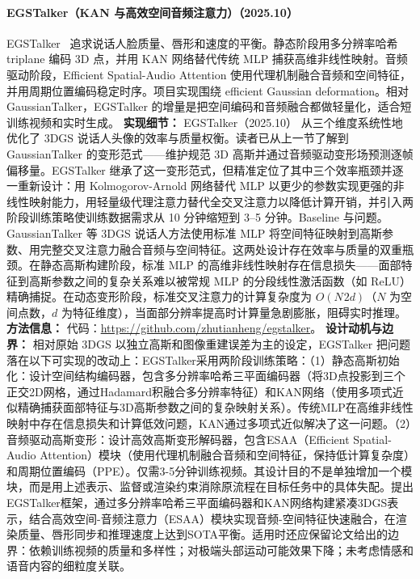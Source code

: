 \paragraph{EGSTalker（KAN 与高效空间音频注意力）（2025.10）}
EGSTalker~\cite{2510_08587} 追求说话人脸质量、唇形和速度的平衡。静态阶段用多分辨率哈希 triplane 编码 3D 点，并用 KAN 网络替代传统 MLP 捕获高维非线性映射。音频驱动阶段，Efficient Spatial-Audio Attention 使用代理机制融合音频和空间特征，并用周期位置编码稳定时序。项目实现围绕 efficient Gaussian deformation。相对 GaussianTalker，EGSTalker 的增量是把空间编码和音频融合都做轻量化，适合短训练视频和实时生成。
\textbf{实现细节：} EGSTalker（2025.10） 从三个维度系统性地优化了 3DGS 说话人头像的效率与质量权衡。读者已从上一节了解到 GaussianTalker 的变形范式——维护规范 3D 高斯并通过音频驱动变形场预测逐帧偏移量。EGSTalker 继承了这一变形范式，但精准定位了其中三个效率瓶颈并逐一重新设计：用 Kolmogorov-Arnold 网络替代 MLP 以更少的参数实现更强的非线性映射能力，用轻量级代理注意力替代全交叉注意力以降低计算开销，并引入两阶段训练策略使训练数据需求从 10 分钟缩短到 3--5 分钟。Baseline 与问题。GaussianTalker 等 3DGS 说话人方法使用标准 MLP 将空间特征映射到高斯参数、用完整交叉注意力融合音频与空间特征。这两处设计存在效率与质量的双重瓶颈。在静态高斯构建阶段，标准 MLP 的高维非线性映射存在信息损失——面部特征到高斯参数之间的复杂关系难以被常规 MLP 的分段线性激活函数（如 ReLU）精确捕捉。在动态变形阶段，标准交叉注意力的计算复杂度为 $O(N^{}2 d)$（$N$ 为空间点数，$d$ 为特征维度），当面部分辨率提高时计算量急剧膨胀，阻碍实时推理。
\textbf{方法信息：} 代码：\url{https://github.com/zhutianheng/egstalker}。
\textbf{设计动机与边界：} 相对原始 3DGS 以独立高斯和图像重建误差为主的设定，EGSTalker 把问题落在以下可实现的改动上：EGSTalker采用两阶段训练策略：（1）静态高斯初始化：设计空间结构编码器，包含多分辨率哈希三平面编码器（将3D点投影到三个正交2D网格，通过Hadamard积融合多分辨率特征）和KAN网络（使用多项式近似精确捕获面部特征与3D高斯参数之间的复杂映射关系）。传统MLP在高维非线性映射中存在信息损失和计算低效问题，KAN通过多项式近似解决了这一问题。（2）音频驱动高斯变形：设计高效高斯变形解码器，包含ESAA（Efficient Spatial-Audio Attention）模块（使用代理机制融合音频和空间特征，保持低计算复杂度）和周期位置编码（PPE）。仅需3-5分钟训练视频。其设计目的不是单独增加一个模块，而是用上述表示、监督或渲染约束消除原流程在目标任务中的具体失配。提出EGSTalker框架，通过多分辨率哈希三平面编码器和KAN网络构建紧凑3DGS表示，结合高效空间-音频注意力（ESAA）模块实现音频-空间特征快速融合，在渲染质量、唇形同步和推理速度上达到SOTA平衡。适用时还应保留论文给出的边界：依赖训练视频的质量和多样性；对极端头部运动可能效果下降；未考虑情感和语音内容的细粒度关联。
